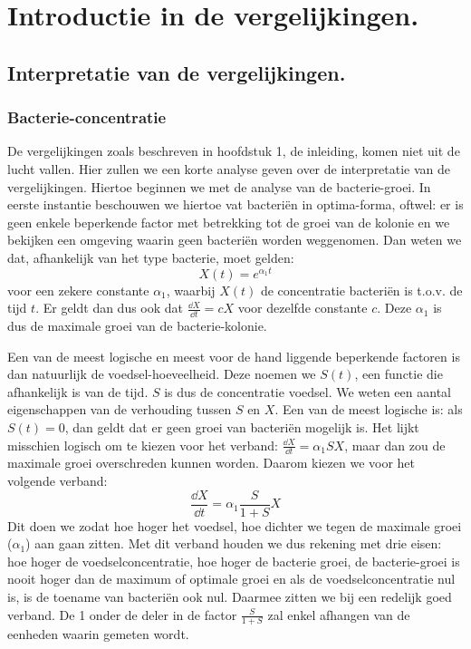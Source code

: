 

\chapter{Introductie in de vergelijkingen.} %


\section{Interpretatie van de vergelijkingen.}

\subsection*{Bacterie-concentratie}
De vergelijkingen zoals beschreven in hoofdstuk 1, de inleiding, komen niet uit de lucht vallen. Hier zullen we een korte analyse geven over de interpretatie van de vergelijkingen. Hiertoe beginnen we met de analyse van de bacterie-groei. In eerste instantie beschouwen we hiertoe vat bacteri\"en in optima-forma, oftwel: er is geen enkele beperkende factor met betrekking tot de groei van de kolonie en we bekijken een omgeving waarin geen bacteri\"en worden weggenomen. Dan weten we dat, afhankelijk van het type bacterie, moet gelden:
\begin{equation*}
	X(t) = e^{\alpha_1t} 		
\end{equation*}
voor een zekere constante $\alpha_1$, waarbij $X(t)$ de concentratie bacteri\"en is t.o.v. de tijd $t$. Er geldt dan dus ook dat $\tfrac{\dd X}{\dd t} = c X$ voor dezelfde constante $c$. Deze $\alpha_1$ is dus de maximale groei van de bacterie-kolonie. 

Een van de meest logische en meest voor de hand liggende beperkende factoren is dan natuurlijk de voedsel-hoeveelheid. Deze noemen we $S(t)$, een functie die afhankelijk is van de tijd. $S$ is dus de concentratie voedsel. We weten een aantal eigenschappen van de verhouding tussen $S$ en $X$. Een van de meest logische is: als $S(t) = 0$, dan geldt dat er geen groei van bacteri\"en mogelijk is. Het lijkt misschien logisch om te kiezen voor het verband: $\tfrac{\dd X}{\dd t} =  \alpha_1 S X$, maar dan zou de maximale groei overschreden kunnen worden. Daarom kiezen we voor het volgende verband:
\begin{equation*}
	\frac{\dd X} {\dd t} = \alpha_1 \frac{S}{1 + S} X
\end{equation*}
Dit doen we zodat hoe hoger het voedsel, hoe dichter we tegen de maximale groei ($\alpha_1$) aan gaan zitten. Met dit verband houden we dus rekening met drie eisen: hoe hoger de voedselconcentratie, hoe hoger de bacterie groei, de bacterie-groei is nooit hoger dan de maximum of optimale groei en als de voedselconcentratie nul is, is de toename van bacteri\"en ook nul. Daarmee zitten we bij een redelijk goed verband. De 1 onder de deler in de factor $\frac{S}{1+S}$ zal enkel afhangen van de eenheden waarin gemeten wordt. 

